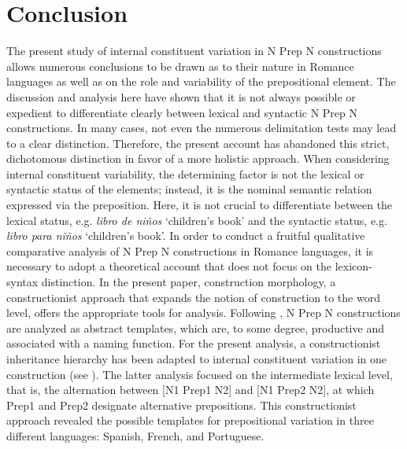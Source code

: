 \documentclass[output=paper]{langsci/langscibook}
\begin{document}
\section{Conclusion}

The present study of internal constituent variation in N Prep N constructions allows numerous conclusions to be drawn as to their nature in Romance languages as well as on the role and variability of the prepositional element. The discussion and analysis here have shown that it is not always possible or expedient to differentiate clearly between lexical and syntactic N Prep N constructions. In many cases, not even the numerous delimitation tests may lead to a clear distinction. Therefore, the present account has abandoned this strict, dichotomous distinction in favor of a more holistic approach. When considering internal constituent variability, the determining factor is not the lexical or syntactic status of the elements; instead, it is the nominal semantic relation expressed via the preposition. Here, it is not crucial to differentiate between the lexical status, e.g. \textit{libro de niños }`children’s book' and the syntactic status, e.g. \textit{libro para niños} `children’s book'. In order to conduct a fruitful qualitative comparative analysis of N Prep N constructions in Romance languages, it is necessary to adopt a theoretical account that does not focus on the lexicon-syntax distinction. In the present paper, construction morphology, a constructionist approach that expands the notion of construction to the word level, offers the appropriate tools for analysis. Following \citet[261]{Masini:2009}, N Prep N constructions are analyzed as abstract templates, which are, to some degree, productive and associated with a naming function. For the present analysis, a constructionist inheritance hierarchy has been adapted to internal constituent variation in one construction (see ). The latter analysis focused on the intermediate lexical level, that is, the alternation between [N1 Prep1 N2] and [N1 Prep2 N2], at which Prep1 and Prep2 designate alternative prepositions. This constructionist approach revealed the possible templates for prepositional variation in three different languages: Spanish, French, and Portuguese. 
\end{document}
